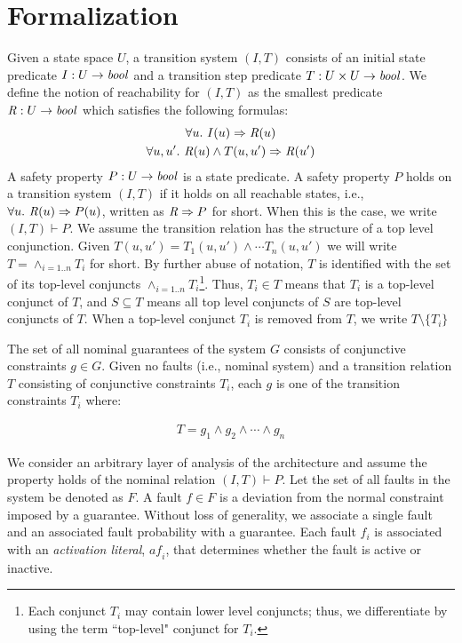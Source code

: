 \section{Formalization}
\label{sec:formalization}
Given a state space $U$, a transition system $(I,T)$ consists of an
initial state predicate $I : U \to \mathit{bool}$ and a transition step
predicate $T : U \times U \to \mathit{bool}$.
We define the notion of
reachability for $(I, T)$ as the smallest predicate $\mathit{R} : U \to
\mathit{bool}$ which satisfies the following formulas:
\begin{gather*}
  \forall u.~ I(u) \Rightarrow \mathit{R}(u) \\
  \forall u, u'.~ \mathit{R}(u) \land T(u, u') \Rightarrow \mathit{R}(u')
\end{gather*}
A safety property $P : U \to \mathit{bool}$ is a state predicate. A safety
property $P$ holds on a transition system $(I, T)$ if it holds on all
reachable states, i.e., $\forall u.~ \mathit{R}(u) \Rightarrow P(u)$,
written as $\mathit{R} \Rightarrow P$ for short. When this is the case, we
write $(I, T)\vdash P$. We assume the transition relation has the structure of a top level conjunction. Given $T(u, u') = T_1(u,u') \land \cdots T_n(u,u')$ we will write $T = \land_{i=1..n}T_i$ for short. By further abuse of notation, $T$ is identified with the set of its top-level conjuncts $\land_{i=1..n}T_i$\footnote{Each conjunct $T_i$ may contain lower level conjuncts; thus, we differentiate by using the term ``top-level" conjunct for $T_i$.}. Thus, $T_i \in T$ means that $T_i$ is a top-level conjunct of $T$, and $S\subseteq T$ means all top level conjuncts of $S$ are top-level conjuncts of $T$. When a top-level conjunct $T_i$ is removed from $T$, we write $T \setminus \{T_i\}$

The set of all nominal guarantees of the system $G$ consists of conjunctive constraints $g \in G$. Given no faults (i.e., nominal system) and a transition relation $T$ consisting of conjunctive constraints $T_i$, each $g$ is one of the transition constraints $T_i$ where:

\begin{gather}
T = g_1 \land  g_2 \land \cdots \land g_n
\label{eq:Tn}
\end{gather}

We consider an arbitrary layer of analysis of the architecture and assume the property holds of the nominal relation $(I,T) \vdash P$. Let the set of all faults in the system be  denoted as $F$. A fault $f \in F$ is a deviation from the normal constraint imposed by a guarantee. Without loss of generality, we associate a single fault and an associated fault probability with a guarantee. Each fault $f_i$ is associated with an \emph{activation literal}, $\mathit{af_i}$, that determines whether the fault is active or inactive. %

